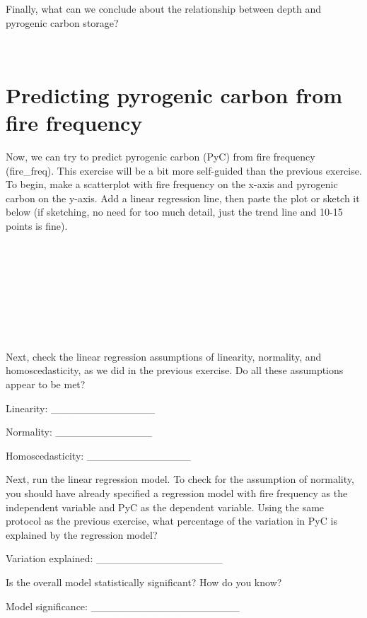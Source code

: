 \documentclass[
  openany]{scrbook}
\begin{document}
Finally, what can we conclude about the relationship between depth and pyrogenic carbon storage?

\begin{verbatim}


\end{verbatim}

\hypertarget{predicting-pyrogenic-carbon-from-fire-frequency}{%
\section{Predicting pyrogenic carbon from fire frequency}\label{predicting-pyrogenic-carbon-from-fire-frequency}}

Now, we can try to predict pyrogenic carbon (PyC) from fire frequency (fire\_freq).
This exercise will be a bit more self-guided than the previous exercise.
To begin, make a scatterplot with fire frequency on the x-axis and pyrogenic carbon on the y-axis.
Add a linear regression line, then paste the plot or sketch it below (if sketching, no need for too much detail, just the trend line and 10-15 points is fine).

\begin{verbatim}








\end{verbatim}

Next, check the linear regression assumptions of linearity, normality, and homoscedasticity, as we did in the previous exercise.
Do all these assumptions appear to be met?

Linearity: \_\_\_\_\_\_\_\_\_\_\_\_\_\_

Normality: \_\_\_\_\_\_\_\_\_\_\_\_\_

Homoscedasticity: \_\_\_\_\_\_\_\_\_\_\_\_\_\_

Next, run the linear regression model.
To check for the assumption of normality, you should have already specified a regression model with fire frequency as the independent variable and PyC as the dependent variable.
Using the same protocol as the previous exercise, what percentage of the variation in PyC is explained by the regression model?

Variation explained: \_\_\_\_\_\_\_\_\_\_\_\_\_\_\_\_\_

Is the overall model statistically significant?
How do you know?

Model significance: \_\_\_\_\_\_\_\_\_\_\_\_\_\_\_\_\_\_\_\_
\end{document}
